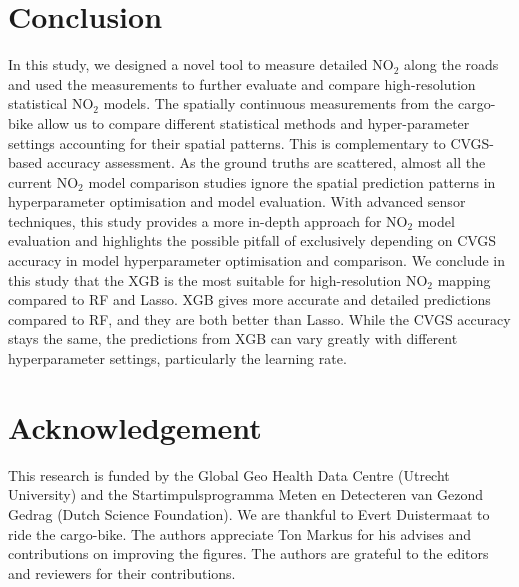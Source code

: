 \documentclass{article}
\begin{document}
\section{Conclusion}
In this study, we designed a novel tool to measure detailed NO$_2$ along the roads and used the measurements to further evaluate and compare high-resolution statistical NO$_2$ models.  The spatially continuous measurements from the cargo-bike allow us to compare different statistical methods and hyper-parameter settings accounting for their spatial patterns. This is complementary to CVGS-based accuracy assessment. As the ground truths are scattered, almost all the current NO$_2$ model comparison studies ignore the spatial prediction patterns in hyperparameter optimisation and model evaluation. With advanced sensor techniques, this study provides a more in-depth approach for NO$_2$ model evaluation and highlights the possible pitfall of exclusively depending on CVGS accuracy in model hyperparameter optimisation and comparison. We conclude in this study that the XGB is the most suitable for high-resolution NO$_2$ mapping compared to RF and Lasso. XGB gives more accurate and detailed predictions compared to RF, and they are both better than Lasso. While the CVGS accuracy stays the same, the predictions from XGB can vary greatly with different hyperparameter settings, particularly the learning rate.    


\section*{Acknowledgement}
This research is funded by the Global Geo Health Data Centre (Utrecht University) and the Startimpulsprogramma Meten en Detecteren van Gezond Gedrag (Dutch Science Foundation). We are thankful to Evert Duistermaat to ride the cargo-bike. The authors appreciate Ton Markus for his advises and contributions on improving the figures. The authors are grateful to the editors and reviewers for their contributions. 

\newpage


\end{document}
